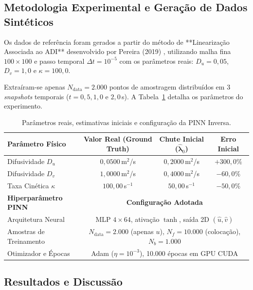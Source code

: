 \documentclass[a4paper, 12pt, twoside]{article}
\begin{document}
\subsection{Metodologia Experimental e Geração de Dados Sintéticos}

Os dados de referência foram gerados a partir do método de **Linearização Associada ao ADI**
desenvolvido por Pereira (2019) \cite{pereira2019}, utilizando malha fina $100 \times 100$ e passo
temporal $\Delta t = 10^{-5}$ com os parâmetros reais: $D_u = 0{,}05$, $D_v = 1{,}0$ e $\kappa = 100{,}0$.

Extraíram-se apenas $N_{\mathrm{data}} = 2.000$ pontos de amostragem distribuídos em 3 \textit{snapshots}
temporais ($t = 0{,}5, 1{,}0$ e $2{,}0$\,s). A Tabela~\ref{tab:config} detalha os parâmetros do experimento.

\begin{table}[htbp]
\centering
\footnotesize
\caption{Parâmetros reais, estimativas iniciais e configuração da PINN Inversa.}
\label{tab:config}
\begin{tabular}{lccc}
\hline
\textbf{Parâmetro Físico} & \textbf{Valor Real (Ground Truth)} & \textbf{Chute Inicial ($\hat{\boldsymbol{\lambda}}_0$)} & \textbf{Erro Inicial} \\ \hline
Difusividade $D_u$ & $0{,}0500$\,m$^2$/s & $0{,}2000$\,m$^2$/s & $+300{,}0\%$ \\
Difusividade $D_v$ & $1{,}0000$\,m$^2$/s & $0{,}4000$\,m$^2$/s & $-60{,}0\%$ \\
Taxa Cinética $\kappa$ & $100{,}00$\,s$^{-1}$ & $50{,}00$\,s$^{-1}$ & $-50{,}0\%$ \\ \hline
\textbf{Hiperparâmetro PINN} & \multicolumn{3}{c}{\textbf{Configuração Adotada}} \\ \hline
Arquitetura Neural & \multicolumn{3}{c}{MLP $4 \times 64$, ativação $\tanh$, saída 2D $(\hat{u}, \hat{v})$} \\
Amostras de Treinamento & \multicolumn{3}{c}{$N_{\mathrm{data}} = 2.000$ (apenas $u$), $N_f = 10.000$ (colocação), $N_b = 1.000$} \\
Otimizador e Épocas & \multicolumn{3}{c}{Adam ($\eta = 10^{-3}$), 10.000 épocas em GPU CUDA} \\ \hline
\end{tabular}
\end{table}

\subsection{Resultados e Discussão}
\end{document}
